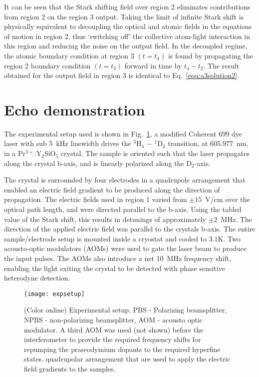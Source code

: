                                                                                                                                                                                                                                                                                                                                                                                                                                                                                                                                                                                                                                                                                                                                                                                                                                                                                                                                                                                                                                                                                                                                                                                                                                                                                                                                                                                                                                                                                                                                                                                                                                                                                                                                                                                                                                                                                                                                                                                                                                                                                                                                                                                                                                                                                                                                                                                                                                                                                                                                                                                                                                                                                                                                                                                                                                                                                                                                                                                                                                                                                                                                                                                                                                                                                                                                                                                                                                                                                                                                                                                                                                                                                                                                                                                                                                                                                                                                                                                                                                                                                                                                                                                                                                                                                                                                                                                                                                                                                                                                                                                                                                                                                                                                                                                                                                                                                                                                                                                                                                                                                                                                                                                                                                                                                                                                                                                                                                                                                                                                                                                                                                                                                                                                                                                                                                                                                                                                                                                                                                                                                                                                                                                                                                                                                                                                                                                                                                                                                                                                                                                                                                                                                                                                                                                                                                                                                                                                                                                                                                                                                                                                                                                                                                                                                                                                                                                                                                                                                                                                                                                                                                                                                                                                                                                                                                                                                                                                                                                                                                                                                                                                                                                                                                                                                                                                                                                                                                                                                                                                                                                                                                                                                                                                                                                                                                                                                                                                                                                                                                                                                                                                                                                                                                                                                                                                                                                                                                                                                                                                                                                                                                                                                                                                                                                                                                                                                                                                                                                                                                                                                                                                                                                                                                                                                                                                                                                                                                                                                                                                                                                                                                                                                                                                                                                                                                                                                                                                                                                                                                                                                                                                                                                                                                                                                                                                                                                                                                                                                                                                                                                                                                                                                                                                                                                                                                                                                                                                                                                                                                                                                                                                                                                                                                                                                                                                                                                                                                                                                                                                                                                                                                                                                                                                                                                                                                                                                                                                                                                                                                                                                                                                                                                                                                                                                                                                                                                                                                                                                                                                                                                                                                                                                                                                                                                                                                                                                                                                                                                                                                                                                                                                                                                                                                                                                                                                                                                                                                                                                                                                                                                                                                                                                                                                                                                                                                                                                                                                                                                                                                                                                                                                                                                                                                                                                                                                                                                                                                                                                                                                                                                                                                                                                                                                                                                                                                                                                                                                                                                                                                                                                                                                                                                                                                                                                                                                                                                                                                                                                                                                                                                                                                                                                                                                                                                                                                                                                                                                                                                                                                                                                                                                                                                                                                                                                                                                                                                                                                                                                                                                                                                                                                                                                                                                                                                                                                                                                                                                                                                                                                                                                                                                                                                                                                                                                                                                                                                                                                                                                                                                                                                                                                                                                                                                                                                                                                                                                                                                                                                                                                                                                                                                                                                                                                                                                                                                                                                                                                                                                                                                                                                                                                                                                                                                                                                                                                                                                                                                                                                                                                                                                                                                                                                                                                                                                                                                                                                                                                                                                                                                                                                                                                                                                                                                                                                                                                                                                                                                                                                                                                                                                                                                                                                                                                                                                                                                                                                                                                                                                                                                                                                                                                                                                                                                                                                                                                                                                                                                                                                                                                                                                                                                                                                                                                                                                                                                                                                                                                                                                                                                                                                                                                                                                                                                                                                                                                                                                                                                                                                                                                                                                                                                                                                                                                                                                                                                                                                                                                                                                                                                                                                                                                                                                                                                                                                                                                                                                                                                                                                                                                                                                                                                                                                                                                                                                                                                                                                                                                                                                                                                                                                                                                                                                                                                                                                                                                                                                                                                                                                                                                                                                                                                                                                                                                                                                                                                                                                                                                                                                                                                                                                                                                                                                                                                                                                                                                                                                                                                                                                                                                                                                                                                                                                                                                                                                                                                                                                                                                                                                                                                                                                                                                                                                                                                                                                                                                                                                                                                                                                                                                                                                                                                                                                                                                                                                                                                                                                                                                                                                                                                                                                                                                                                                                                                                                                                                                                                                                                                                                                                                                                                                                                                                                                                                                                                                                                                                                                                                                                                                                                                                                                                                                                                                                                                                                                                                                                                                                                                                                                                                                                                                                                                                                                                                                                                                                                                                                                                                                                                                                                                                                                                                                                                                                                                                                                                                                                                                                                                                                                                                                                                                                                                                                                                                                                                                                                                                                                                                                                                                                                                                                                                                                                                                                                                                                                                                                                                                                                                                                                                                                                                                                                                                                                                                                                                                                                                                                                                                                                                                                                                                                                                                                                                                                                                                                                                                                                                                                                                                                                                                                                                                                                                                                                                                                                                                                                                                                                                                                                                                                                                                                                                                                                                                                                                                                                                                                                                                                                                                                                                                                                                                                                                                                                                                                                                                                                                                                                                                                                                                                                                                                                                                                                                                                                                                                                                                                                                                                                                                                                                                                                                                                                                                                                                                                                                                                                                                                                                                                                                                                                                                                                                                                                                                                                                                                                                                                                                                                                                                                                                                                                                                                                                                                                                                                                                                                                                                                                                                                                                                                                                                                                                                                                                                                                                                                                                                                                                                                                                                                                                                                                                                                                                                                                                                                                                                                                                                                                                                                                                                                                                                                                                                                                                                                                                                                                                                                                                                                                                                                                                                                                                                                                                                                                                                                                                                                                                                                                                                                                                                                                                                                                                                                                                                                                                                                                                                                                                                                                                                                                                                                                                                                                                                                                                                                                                                                                                                                                                                                                                                                                                                                                                                                                                                                                                                                                                                                                                                                                                                                                                                                                                                                                                                                                                                                                                                                                                                                                                                                                                                                                                                                                                                                                                                                                                                                                                                                                                                                                                                                                                                                                                                                                                                                                                                                                                                                                                                                                                                                                                                                                                                                                                                                                                                                                                                                                                                                                                                                                                                                                                                                                                                                                                                                                                                                                                                                                                                                                                                                                                                                                                                                                                                                                                                                                                                                                                                                                                                                                                                                                                                                                                                                                                                                                                                                                                                                                                                                                                                                                                                                                                                                                                                                                                                                                                                                                                                                                                                                                                                                                                                                                                                                                                                                                                                                                                                                                                                                                                                                                                                                                                                                                                                                                                                                                                                                                                                                                                                                                                                                                                                                                                                                                                                                                                                                                                                                                                                                                                                                                                                                                                                                                                                                                                                                                                                                                                                                                                                                                                                                                                                                                                                                                                                                                                                                                                                                                                                                                                                                                                                                                                                                                                                                                                                                                                                                                                                                                                                                                                                                                                                                                                                                                                                                                                                                                                                                                                                                                                                                                                                                                                                                                                                                                                                                                                                                                                                                                                                                                                                                                                                                                                                                                                                                                                                                                                                                                                                                                                                                                                                                                                                                                                                                                                                                                                                                                                                                                                                                                                                                                                                                                                                                                                                                                                                                                                                                                                                                                                                                                                                                                                                                                                                                                                                                                                                                                                                                                                                                                                                                                                                                                                                                                                                                                                                                                                                                                                                                                                                                                                                                                                                                                                                                                                                                                                                                                                                                                                                                                                                                                                                                                                                                                                                                                                                                                                                                                                                                                                                                                                                                                                                                                                                                                                                                                                                                                                                                                                                                                                                                                                                                                                                                                                                                                                                                                                                                                                                                                                                                                                                                                                                                                                                                                                                                                                                                                                                                                                                                                                                                                    \documentclass[superscriptaddress,pra,twocolumn,showpacs,amsmath,amssymb,aps,a4paper]{revtex4}
\newcommand{\PRYSO}{Pr$^{3+}$:Y$_2$SiO$_5$ }
\begin{document}
It can be seen that the Stark shifting field over region 2 eliminates
contributions from region 2 on the region 3 output. Taking the limit
of infinite Stark shift is physically equivalent to decoupling the
optical and atomic fields in the equations of motion in region 2, thus
`switching off' the collective atom-light interaction in this region
and reducing the noise on the output field. In the decoupled regime,
the atomic boundary condition at region 3 $(t = t_4)$ is found by
propagating the region 2 boundary condition $(t = t_2)$ forward in
time by $t_4 - t_2$. The result obtained for the output field in
region 3 is identical to Eq.~\ref{equ:a3solution2}.



\section{Echo demonstration}


The experimental setup used is shown in Fig.~\ref{fig:expsetup}, a
modified Coherent 699 dye laser with sub 5~kHz linewidth drives the
$^3$H$_4$ $-$ $^1$D$_2$ transition, at 605.977~nm, in a \PRYSO
crystal. The sample is oriented such that the laser
propagates along the crystal b-axis, and is linearly polarized along
the D$_2$-axis.

The crystal is surrounded by four electrodes in a quadrupole
arrangement that enabled an electric field gradient to be produced
along the direction of propagation. The electric fields used in region
1 varied from $\pm15$~V/cm over the optical path length, and were
directed parallel to the b-axis. Using the tabled value of the Stark
shift\cite{graf98}, this results in detunings of approximately
$\pm2$~MHz. The direction of the applied electric field was parallel
to the crystals b-axis.  The entire sample/electrode setup is mounted
inside a cryostat and cooled to $3.1\textrm{K}$.  Two acousto-optic
modulators (AOMs) were used to gate the laser beam to produce the
input pulses. The AOMs also introduce a net 10~MHz frequency shift,
enabling the light exiting the crystal to be detected with phase
sensitive heterodyne detection.
 

\begin{figure}  \centering
  \texttt{[image: expsetup]}
\caption{\label{fig:expsetup}(Color online)
 Experimental setup. PBS - Polarizing beamsplitter, NPBS -
 non-polarizing beamsplitter, AOM - acousto optic modulator. A third
 AOM was used (not shown) before the interferometer to provide the
 required frequency shifts for repumping the praseodymium dopants to
 the required hyperfine states. 
 %
 quadrupolar arrangement that are used to apply the electric field
 gradients to the samples. 
 }
\end{figure}
\end{document}
